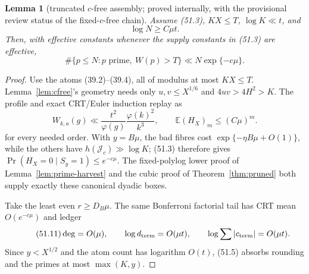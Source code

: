 \documentclass[10pt,reqno]{amsart}
\newtheorem{lemma}[theorem]{Lemma}
\theoremstyle{definition}
\newcommand{\1}{\mathbf 1}
\begin{document}
\begin{lemma}[truncated $c$-free assembly; proved internally, with the
provisional review status of the fixed-$c$-free chain]
\label{lem:truncated-cfree}
Assume (51.3), $KX\leq T$, $\log K\ll t$, and
\begin{equation}\tag{51.5}
                         \log N\geq C\mu t.
\end{equation}
Then, with effective constants whenever the supply constants in (51.3) are
effective,
\begin{equation}\tag{51.6}
 \#\{p\leq N:p\text{ prime},\ W(p)>T\}
       \ll N\exp\{-c\mu\}.
\end{equation}
\end{lemma}
\begin{proof}
Use the atoms (39.2)--(39.4), all of modulus at most $KX\leq T$.
Lemma~\ref{lem:cfree}'s geometry needs only $u,v\leq X^{1/6}$ and
$4uv>4H^2>K$.  The profile and exact CRT/Euler induction replay as
\begin{equation}\tag{51.7--51.8}
 W_{k,a}(g)\ll\frac{t^2}{\varphi(g)}\frac{\varphi(k)^2}{k^3},
 \qquad \mathbb E(H_X)_m\leq(C\mu)^m.
\end{equation}
for every needed order.  With $y=B\mu$, the bad fibres cost
$\exp\{-\eta B\mu+O(1)\}$, while the others have
$h(\mathcal J_c)\gg\log K$; (51.3) therefore gives
$\Pr(H_X=0\mid S_y=1)\leq e^{-c\mu}$.  The fixed-polylog lower proof of
Lemma~\ref{lem:prime-harvest} and the cubic proof of
Theorem~\ref{thm:pruned} both supply exactly these canonical dyadic boxes.

Take the least even $r\geq D_B\mu$.  The same Bonferroni factorial tail has
CRT mean $O(e^{-c\mu})$ and ledger
\begin{equation}\tag{51.11}\label{eq:witness-ledger}
 \deg=O(\mu),\qquad \log d_{\rm term}=O(\mu t),\qquad
 \log\sum|c_{\rm term}|=O(\mu t).
\end{equation}
Since $y<X^{1/2}$ and the atom count has logarithm $O(t)$, (51.5) absorbs
rounding and the primes at most $\max(K,y)$.
\end{proof}
\end{document}
